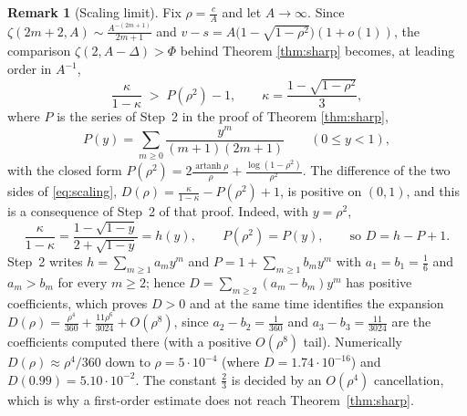 \documentclass[11pt,a4paper]{amsart}
\theoremstyle{definition}
\newtheorem{remark}[theorem]{Remark}
\DeclareMathOperator{\artanh}{artanh}
\begin{document}
\begin{remark}[Scaling limit]\label{rem:scaling}
Fix $\rho=\frac{c}{A}$ and let $A\to\infty$. Since $\zeta(2m+2,A)\sim\frac{A^{-(2m+1)}}{2m+1}$
and $v-s=A\big(1-\sqrt{1-\rho^{2}}\big)(1+o(1))$, the comparison
$\zeta(2,A-\Delta)>\Phi$ behind Theorem \ref{thm:sharp} becomes, at leading order in
$A^{-1}$,
\begin{equation}\label{eq:scaling}
  \frac{\kappa}{1-\kappa}\;>\;P(\rho^{2})-1,
  \qquad \kappa=\frac{1-\sqrt{1-\rho^{2}}}{3},
\end{equation}
where $P$ is the series of Step~2 in the proof of Theorem \ref{thm:sharp},
\begin{equation}\label{eq:P}
  P(y)=\sum_{m\ge0}\frac{y^{m}}{(m+1)(2m+1)}\qquad(0\le y<1),
\end{equation}
with the closed form
$P(\rho^{2})=2\frac{\artanh\rho}{\rho}+\frac{\log(1-\rho^{2})}{\rho^{2}}$. The difference
of the two sides of \eqref{eq:scaling},
$D(\rho)=\frac{\kappa}{1-\kappa}-P(\rho^{2})+1$, is positive on $(0,1)$, and this is a
consequence of Step~2 of that proof. Indeed, with $y=\rho^{2}$,
\[
  \frac{\kappa}{1-\kappa}=\frac{1-\sqrt{1-y}}{2+\sqrt{1-y}}=h(y),
  \qquad P(\rho^{2})=P(y),
  \qquad\text{so } D=h-P+1 .
\]
Step~2 writes $h=\sum_{m\ge1}a_{m}y^{m}$ and $P=1+\sum_{m\ge1}b_{m}y^{m}$ with
$a_{1}=b_{1}=\frac16$ and $a_{m}>b_{m}$ for every $m\ge2$; hence
$D=\sum_{m\ge2}(a_{m}-b_{m})y^{m}$ has positive coefficients, which proves $D>0$ and at the
same time identifies the expansion
$D(\rho)=\frac{\rho^{4}}{360}+\frac{11\rho^{6}}{3024}+O(\rho^{8})$, since
$a_2-b_2=\frac1{360}$ and $a_3-b_3=\frac{11}{3024}$ are the coefficients computed there
(with a positive $O(\rho^{8})$ tail). Numerically $D(\rho)\approx\rho^{4}/360$ down to
$\rho=5\cdot10^{-4}$ (where $D=1.74\cdot10^{-16}$) and $D(0.99)=5.10\cdot10^{-2}$. The
constant $\frac23$ is decided by an $O(\rho^{4})$ cancellation, which is why a first-order
estimate does not reach Theorem~\ref{thm:sharp}.
\end{remark}
\end{document}
